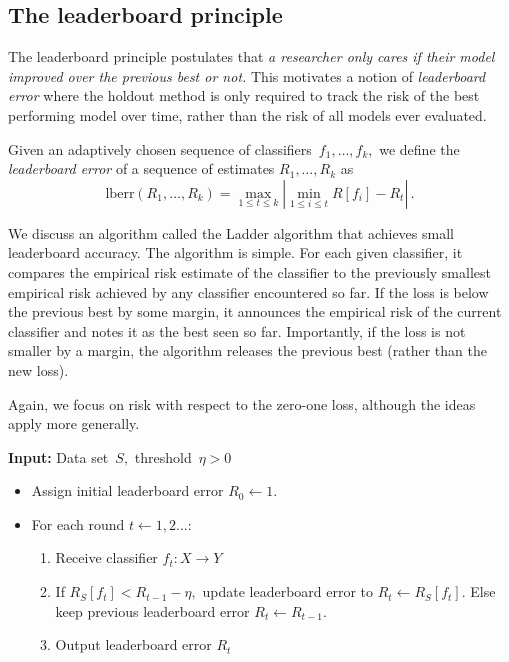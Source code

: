 \documentclass{tufte-book}
\begin{document}
\hypertarget{the-leaderboard-principle}{%
\subsection{The leaderboard principle}\label{the-leaderboard-principle}}

The leaderboard principle postulates that \emph{a researcher only cares
if their model improved over the previous best or
not.} This
motivates a notion of \emph{leaderboard error} where the holdout method
is only required to track the risk of the best performing model over
time, rather than the risk of all models ever evaluated.

\begin{Definition}

Given an adaptively chosen sequence of classifiers~\(f_1,\dots,f_k,\) we
define the \emph{leaderboard error} of a sequence of estimates
\(R_1,\dots,R_k\) as \[
\mathrm{lberr}(R_1,\dots,R_k)=
\max_{1\le t\le k}\left|\min_{1\le i\le t} R[f_i] - R_t\right|\,.
\]

\end{Definition}

We discuss an algorithm called the Ladder algorithm that achieves small
leaderboard accuracy. The algorithm is simple. For each given
classifier, it compares the empirical risk estimate of the classifier to
the previously smallest empirical risk achieved by any classifier
encountered so far. If the loss is below the previous best by some
margin, it announces the empirical risk of the current classifier and
notes it as the best seen so far. Importantly, if the loss is not
smaller by a margin, the algorithm releases the previous best (rather
than the new loss).

Again, we focus on risk with respect to the zero-one loss, although the
ideas apply more generally.

\begin{Algorithm}

\textbf{Input:} Data set~\(S,\) threshold~\(\eta>0\)

\begin{itemize}
\tightlist
\item
  Assign initial leaderboard error \(R_0\leftarrow 1.\)
\item
  For each round \(t \leftarrow 1,2 \ldots:\)

  \begin{enumerate}
  \def\labelenumi{\arabic{enumi}.}
  \tightlist
  \item
    Receive classifier \(f_t\colon X\to Y\)
  \item
    If \(R_S[f_t] < R_{t-1} - \eta,\) update leaderboard error to
    \(R_t\leftarrow R_S[f_t].\) Else keep previous leaderboard error
    \(R_t\leftarrow R_{t-1}.\)
  \item
    Output leaderboard error \(R_t\)
  \end{enumerate}
\end{itemize}

\end{Algorithm}
\end{document}

